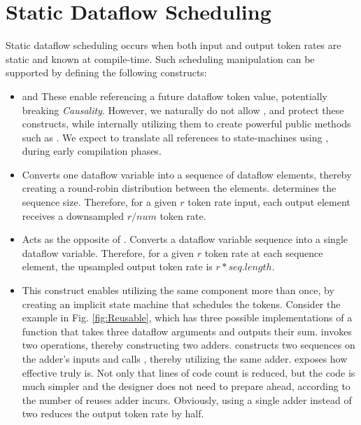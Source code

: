 \section{Static Dataflow Scheduling}
Static dataflow scheduling occurs when both input and output token rates are static and known at compile-time. Such scheduling manipulation can be supported by defining the following constructs:
\begin{itemize}
  \item {} and \quad These enable referencing a future dataflow token value, potentially breaking \textit{Causality}. However, we naturally do not allow , and protect these constructs, while internally utilizing them to create powerful public methods such as . We expect to translate all  references to state-machines using , during early compilation phases.
  \item {}\quad Converts one dataflow variable into a sequence of dataflow elements, thereby creating a round-robin distribution between the elements.  determines the sequence size. Therefore, for a given $r$ token rate input, each output element receives a downsampled $r/num$ token rate. 
  \item {}\quad Acts as the opposite of . Converts a dataflow variable sequence into a single dataflow variable. Therefore, for a given $r$ token rate at each sequence element, the upsampled output token rate is $r*seq.length$. 
  \item {}\quad This construct enables utilizing the same component more than once, by creating an implicit state machine that schedules the tokens. Consider the example in Fig. \ref{fig:Reusable}, which has three possible implementations of a function that takes three dataflow arguments and outputs their sum.  invokes two \code{+} operations, thereby constructing two adders.  constructs two sequences on the adder's inputs and calls , thereby utilizing the same adder.  exposes how effective  truly is. Not only that lines of code count is reduced, but the code is much simpler and the designer does not need to prepare ahead, according to the number of reuses adder incurs. Obviously, using a single adder instead of two reduces the output token rate by half.
  

\end{itemize}
